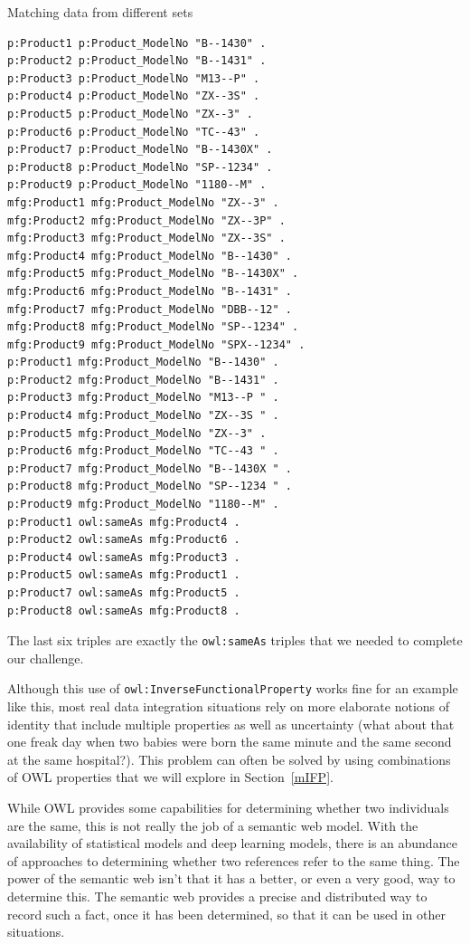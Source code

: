 \begin{challenge}{Matching data from different sets}
\begin{lstlisting}
p:Product1 p:Product_ModelNo "B--1430" .
p:Product2 p:Product_ModelNo "B--1431" .
p:Product3 p:Product_ModelNo "M13--P" .
p:Product4 p:Product_ModelNo "ZX--3S" .
p:Product5 p:Product_ModelNo "ZX--3" .
p:Product6 p:Product_ModelNo "TC--43" .
p:Product7 p:Product_ModelNo "B--1430X" .
p:Product8 p:Product_ModelNo "SP--1234" .
p:Product9 p:Product_ModelNo "1180--M" .
mfg:Product1 mfg:Product_ModelNo "ZX--3" .
mfg:Product2 mfg:Product_ModelNo "ZX--3P" .
mfg:Product3 mfg:Product_ModelNo "ZX--3S" .
mfg:Product4 mfg:Product_ModelNo "B--1430" .
mfg:Product5 mfg:Product_ModelNo "B--1430X" .
mfg:Product6 mfg:Product_ModelNo "B--1431" .
mfg:Product7 mfg:Product_ModelNo "DBB--12" .
mfg:Product8 mfg:Product_ModelNo "SP--1234" .
mfg:Product9 mfg:Product_ModelNo "SPX--1234" .
p:Product1 mfg:Product_ModelNo "B--1430" .
p:Product2 mfg:Product_ModelNo "B--1431" .
p:Product3 mfg:Product_ModelNo "M13--P " .
p:Product4 mfg:Product_ModelNo "ZX--3S " .
p:Product5 mfg:Product_ModelNo "ZX--3" .
p:Product6 mfg:Product_ModelNo "TC--43 " .
p:Product7 mfg:Product_ModelNo "B--1430X " .
p:Product8 mfg:Product_ModelNo "SP--1234 " .
p:Product9 mfg:Product_ModelNo "1180--M" .
p:Product1 owl:sameAs mfg:Product4 .
p:Product2 owl:sameAs mfg:Product6 .
p:Product4 owl:sameAs mfg:Product3 .
p:Product5 owl:sameAs mfg:Product1 .
p:Product7 owl:sameAs mfg:Product5 .
p:Product8 owl:sameAs mfg:Product8 .
\end{lstlisting}  

The last six triples are exactly the \texttt{owl:sameAs} triples that we needed
to complete our challenge.

\end{challenge}

Although this use of \texttt{owl:InverseFunctionalProperty} works fine for an
example like this, most real data integration situations rely on more
elaborate notions of identity that include multiple properties as well
as uncertainty (what about that one freak day when two babies were born
the same minute and the same second at the same hospital?). This problem
can often be solved by using combinations of OWL properties that we will
explore in Section~\ref{mIFP}.  

While OWL provides some capabilities for determining whether two individuals are 
the same, this is not really the job of a semantic web model.  With the 
availability of statistical models and deep learning models, there is an 
abundance of approaches to determining whether two references refer to the
same thing.  The power of the semantic web isn't that it has a better, or even 
a very good, way to determine this.  The semantic web provides a precise and 
distributed way to record such a fact, once it has been determined, so that it 
can be used in other situations. 

